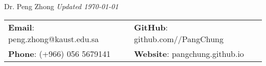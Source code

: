 \documentclass[A4, 12pt]{article}
\begin{document}
\hskip0.2cm{\Huge{Dr. Peng Zhong}
\hfill{\it\footnotesize Updated \today}}


\vspace{0.5cm} 
\hskip0cm\begin{tabular}{ll}
\textbf{Email}: peng.zhong@kaust.edu.sa      &
\hspace{0.55in} \textbf{GitHub}: github.com//PangChung   \\

\textbf{Phone}: (+966) 056 5679141   & 
\hspace{0.55in} \textbf{Website}: pangchung.github.io     
\end{tabular}


\setlength{\tabcolsep}{2pt}
\end{document}
